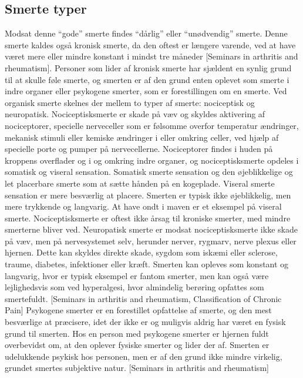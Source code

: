 \subsection{Smerte typer}
Modsat denne “gode” smerte findes “dårlig” eller “unødvendig” smerte. Denne smerte kaldes også kronisk smerte, da den oftest er længere varende, ved at have været mere eller mindre konstant i mindst tre måneder [Seminars in arthritis and rheumatism]. Personer som lider af kronisk smerte har sjældent en synlig grund til at skulle føle smerte, og smerten er af den grund enten oplevet som smerte i indre organer eller psykogene smerter, som er forestillingen om en smerte. 
Ved organisk smerte skelnes der mellem to typer af smerte: nociceptisk og neuropatisk. Nociceptisksmerte er skade på væv og skyldes aktivering af nociceptorer, specielle nerveceller som er følsomme overfor temperatur ændringer, mekanisk stimuli eller kemiske ændringer i eller omkring celler, ved hjælp af specielle porte og pumper på nervecellerne. Nociceptorer findes i huden på kroppens overflader og i og omkring indre organer, og nociceptisksmerte opdeles i somatisk og viseral sensation. Somatisk smerte sensation og den øjeblikkelige og let placerbare smerte som at sætte hånden på en kogeplade. Viseral smerte sensation er mere besværlig at placere. Smerten er typisk ikke øjeblikkelig, men mere trykkende og langvarig. At have ondt i maven er et eksempel på viseral smerte. Nociceptisksmerte er oftest ikke årsag til kroniske smerter, med mindre smerterne bliver ved. 
Neuropatisk smerte er modsat nociceptisksmerte ikke skade på væv, men på nervesystemet selv, herunder nerver, rygmarv, nerve plexus eller hjernen. Dette kan skyldes direkte skade, sygdom som iskæmi eller sclerose, traume, diabetes, infektioner eller kræft. Smerten kan opleves som konstant og langvarig, hvor er typisk eksempel er fantom smerter, men kan også være lejlighedsvis som ved hyperalgesi, hvor almindelig berøring opfattes som smertefuldt. [Seminars in arthritis and rheumatism, Classification of Chronic Pain] 
Psykogene smerter er en forestillet opfattelse af smerte, og den mest besværlige at præcisere, idet der ikke er og muligvis aldrig har været en fysisk grund til smerten. Hos en person med psykogene smerter er hjernen fuldt overbevidst om, at den oplever fysiske smerter og lider der af. Smerten er udelukkende psykisk hos personen, men er af den grund ikke mindre virkelig, grundet smertes subjektive natur. [Seminars in arthritis and rheumatism]

